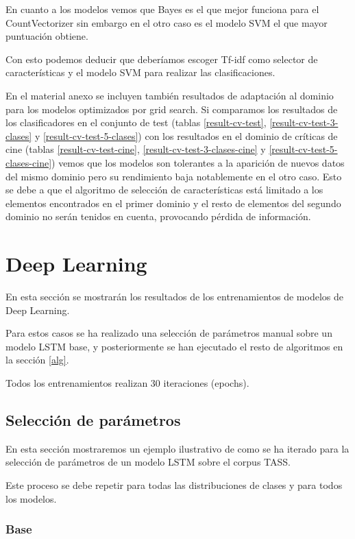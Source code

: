 En cuanto a los modelos vemos que Bayes es el que mejor funciona para el CountVectorizer sin embargo en el otro caso es el modelo SVM el que mayor puntuación obtiene.

Con esto podemos deducir que deberíamos escoger Tf-idf como selector de características y el modelo SVM para realizar las clasificaciones.

En el material anexo se incluyen también resultados de adaptación al dominio para los modelos optimizados por grid search. Si comparamos los resultados de los clasificadores en el conjunto de test (tablas \ref{result-cv-test}, \ref{result-cv-test-3-clases} y \ref{result-cv-test-5-clases}) con los resultados en el dominio de críticas de cine (tablas \ref{result-cv-test-cine}, \ref{result-cv-test-3-clases-cine} y \ref{result-cv-test-5-clases-cine}) vemos que los modelos son tolerantes a la aparición de nuevos datos del mismo dominio pero su rendimiento baja notablemente en el otro caso. Esto se debe a que el algoritmo de selección de características está limitado a los elementos encontrados en el primer dominio y el resto de elementos del segundo dominio no serán tenidos en cuenta, provocando pérdida de información.


\section{Deep Learning}

En esta sección se mostrarán los resultados de los entrenamientos de modelos de Deep Learning.

Para estos casos se ha realizado una selección de parámetros manual sobre un modelo LSTM base, y posteriormente se han ejecutado el resto de algoritmos en la sección \ref{alg}. 

Todos los entrenamientos realizan 30 iteraciones (epochs).

\subsection{Selección de parámetros}

En esta sección mostraremos un ejemplo ilustrativo de como se ha iterado para la selección de parámetros de un modelo LSTM sobre el corpus TASS.

Este proceso se debe repetir para todas las distribuciones de clases y para todos los modelos.

\subsubsection{Base}

